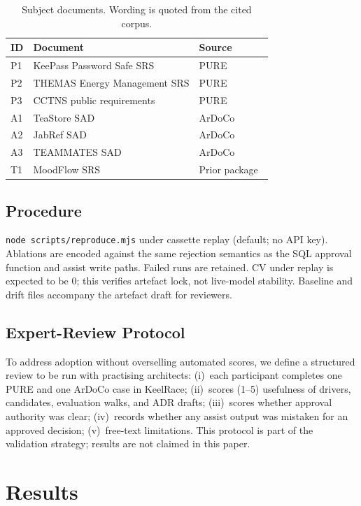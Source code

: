 \documentclass[conference]{IEEEtran}
\begin{document}
\begin{table}[!t]
\caption{Subject documents. Wording is quoted from the cited corpus.}
\label{tab:cases}
\centering
\small
\begin{tabular}{@{}llp{3.6cm}@{}}
\toprule
ID & Document & Source \\
\midrule
P1 & KeePass Password Safe SRS & PURE~\cite{ferrari2017pure} \\
P2 & THEMAS Energy Management SRS & PURE~\cite{ferrari2017pure} \\
P3 & CCTNS public requirements & PURE~\cite{ferrari2017pure} \\
A1 & TeaStore SAD & ArDoCo~\cite{fuchss2023ardoco,kistowski2018teastore} \\
A2 & JabRef SAD & ArDoCo~\cite{fuchss2023ardoco} \\
A3 & TEAMMATES SAD & ArDoCo~\cite{fuchss2023ardoco} \\
T1 & MoodFlow SRS & Prior package~\cite{zenodo2026timearch} \\
\bottomrule
\end{tabular}
\end{table}

\subsection{Procedure}
\texttt{node scripts/reproduce.mjs} under cassette replay (default; no API key).
Ablations are encoded against the same rejection semantics as the SQL approval function and assist write paths.
Failed runs are retained.
CV under replay is expected to be $0$; this verifies artefact lock, not live-model stability.
Baseline and drift files accompany the artefact draft for reviewers.

\subsection{Expert-Review Protocol}
\label{sec:expert}
To address adoption without overselling automated scores, we define a structured review to be run with practising architects:
(i)~each participant completes one PURE and one ArDoCo case in KeelRace;
(ii)~scores (1--5) usefulness of drivers, candidates, evaluation walks, and ADR drafts;
(iii)~scores whether approval authority was clear;
(iv)~records whether any assist output was mistaken for an approved decision;
(v)~free-text limitations.
This protocol is part of the validation strategy; results are not claimed in this paper.

\section{Results}
\end{document}
